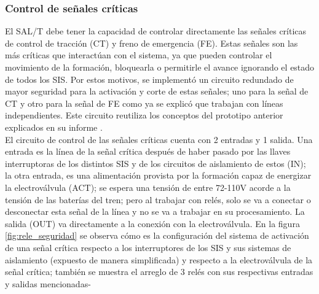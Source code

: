 \subsubsection{Control de señales críticas}

El SAL/T debe tener la capacidad de controlar directamente las señales críticas de control de tracción (CT) y freno de emergencia (FE). Estas señales son las más críticas que interactúan con el sistema, ya que pueden controlar el movimiento de la formación, bloquearla o permitirle el avance ignorando el estado de todos los SIS. Por estos motivos, se implementó un circuito redundado de mayor seguridad para la activación y corte de estas señales; uno para la señal de CT y otro para la señal de FE como ya se explicó que trabajan con líneas independientes. Este circuito reutiliza los conceptos del prototipo anterior explicados en su informe \cite{salt_ivan}.  \\ 

El circuito de control de las señales críticas cuenta con 2 entradas y 1 salida. Una entrada es la línea de la señal crítica después de haber pasado por las llaves interruptoras de los distintos SIS y de los circuitos de aislamiento de estos (IN); la otra entrada, es una alimentación provista por la formación capaz de energizar la electroválvula (ACT); se espera una tensión de entre 72-110V acorde a la tensión de las baterías del tren; pero al trabajar con relés, solo se va a conectar o desconectar esta señal de la línea y no se va a trabajar en su procesamiento. La salida (OUT) va directamente a la conexión con la electroválvula. En la figura \ref{fig:rele_seguridad} se observa cómo es la configuración del sistema de activación de una señal crítica respecto a los interruptores de los SIS y sus sistemas de aislamiento (expuesto de manera simplificada) y respecto a la electroválvula de la señal crítica; también se muestra el arreglo de 3 relés con sus respectivas entradas y salidas mencionadas- 

